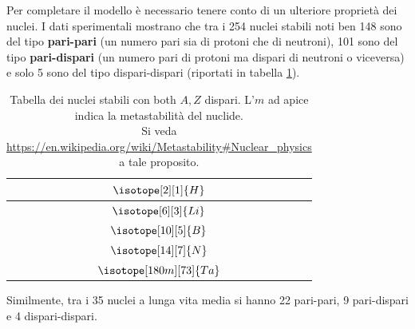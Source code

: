 Per completare il modello è necessario tenere conto di un ulteriore
proprietà dei nuclei.
I dati sperimentali mostrano che tra i 254 nuclei
stabili noti ben 148 sono del tipo \textbf{pari-pari} (un numero pari
sia di protoni che di neutroni), 101 sono del tipo \textbf{pari-dispari}
(un numero pari di protoni ma dispari di neutroni o viceversa) e solo 5
sono del tipo dispari-dispari (riportati in tabella \ref{tab:odd-odd-stable-nuclei}).
\begin{table}
	\centering
	\begin{tabular}{|c|}
		\hline
		$\isotope[2][1]{\mathlarger{H}}$ \\ \hline
		$\isotope[6][3]{\mathlarger{Li}}$ \\ \hline
		$\isotope[10][5]{\mathlarger{B}}$ \\ \hline
		$\isotope[14][7]{\mathlarger{N}}$ \\ \hline
		$\isotope[180m][73]{\mathlarger{Ta}}$ \\ \hline
	\end{tabular}
	\caption{Tabella dei nuclei stabili con both $ A,Z$ dispari. L'$m$ ad apice indica la metastabilità del nuclide. \\
	Si veda \url{https://en.wikipedia.org/wiki/Metastability#Nuclear_physics} a tale proposito.}
	\label{tab:odd-odd-stable-nuclei}
\end{table}

Similmente, tra i 35 nuclei a lunga vita media si hanno 22 pari-pari, 9 pari-dispari e 4
dispari-dispari.

